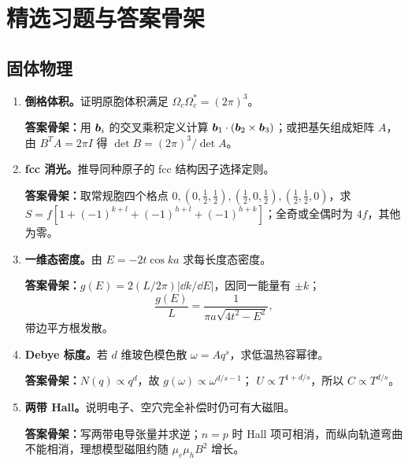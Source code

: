 \appendix
\chapter{精选习题与答案骨架}

\section{固体物理}
\begin{enumerate}
\item \textbf{倒格体积。}证明原胞体积满足
$\Omega_c\Omega_c^*=(2\pi)^3$。

\textbf{答案骨架：}用 $\bm{b}_i$ 的交叉乘积定义计算
$\bm{b}_1\cdot(\bm{b}_2\times\bm{b}_3)$；或把基矢组成矩阵
$A$，由 $B^TA=2\pi I$ 得
$\det B=(2\pi)^3/\det A$。

\item \textbf{fcc 消光。}推导同种原子的 fcc 结构因子选择定则。

\textbf{答案骨架：}取常规胞四个格点
$0,(0,\frac12,\frac12),(\frac12,0,\frac12),
(\frac12,\frac12,0)$，求
$S=f[1+(-1)^{k+l}+(-1)^{h+l}+(-1)^{h+k}]$；全奇或全偶时为 $4f$，其他为零。

\item \textbf{一维态密度。}由
$E=-2t\cos ka$ 求每长度态密度。

\textbf{答案骨架：}$g(E)=2(L/2\pi)|\dd k/\dd E|$，因同一能量有 $\pm k$；
\[
\frac{g(E)}L=\frac1{\pi a\sqrt{4t^2-E^2}},
\]
带边平方根发散。

\item \textbf{Debye 标度。}若 $d$ 维玻色模色散
$\omega=Aq^s$，求低温热容幂律。

\textbf{答案骨架：}$N(q)\propto q^d$，故
$g(\omega)\propto\omega^{d/s-1}$；
$U\propto T^{1+d/s}$，所以
$C\propto T^{d/s}$。

\item \textbf{两带 Hall。}说明电子、空穴完全补偿时仍可有大磁阻。

\textbf{答案骨架：}写两带电导张量并求逆；$n=p$ 时 Hall 项可相消，而纵向轨道弯曲不能相消，理想模型磁阻约随
$\mu_e\mu_hB^2$ 增长。
\end{enumerate}

